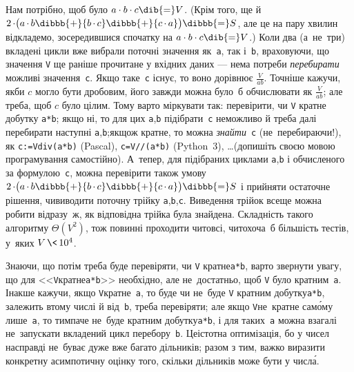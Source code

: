 Нам потрібно, щоб було ${a\cdot b\cdot c}\dib{{=}}V$. (Крім того, ще й ${2\,{\cdot}\bigl(a\,{\cdot}\,b}\dibbb{{+}}{b\,{\cdot}\,c}\dibbb{{+}}{c\,{\cdot}\,a}\bigr)\dibbb{{=}}S$, але це на пару хвилин відкладемо, зосередившися спочатку на ${a\cdot b\cdot c}\dib{{=}}V$.) 
Коли два (а~не~три) вкладені цикли вже вибрали поточні значення як~\texttt{a}, так і~\texttt{b}, враховуючи, що значення \texttt{V} ще раніше прочитане у вхідних даних \nolinebreak[3] --- нема потреби \emph{перебирати} можливі значення~\texttt{c}. Якщо таке~\texttt{c} існує, то воно дорівнює $\frac{V}{ab}$. Точніше кажучи, якби $c$ могло бути дробовим, його завжди можна було~б обчислювати як $\frac{V}{ab}$; але треба, щоб $c$ було цілим. Тому варто міркувати так: перевірити, чи \texttt{V} кратне добутку \texttt{a*b}; якщо ні, то для цих \texttt{a},\nolinebreak[3] \texttt{b} підібрати~\texttt{c} неможливо й треба далі перебирати наступні \texttt{a},\nolinebreak[3] \texttt{b};\linebreak[3] якщо\nolinebreak[3] ж кратне, то можна \emph{знайти}~\texttt{c} (не~перебираючи!), як \texttt{c:=V\nolinebreak[3] div(a*b)} (Pascal), \texttt{c=V//(a*b)} (Python~3), \dots (допишіть своєю мовою програмування самостійно). А~тепер, для підібраних циклами \texttt{a},\nolinebreak[3] \texttt{b} і обчисленого за формулою~\texttt{c}, можна перевірити також умову ${2\,{\cdot}\bigl(a\,{\cdot}\,b}\dibbb{{+}}{b\,{\cdot}\,c}\dibbb{{+}}{c\,{\cdot}\,a}\bigr)\dibbb{{=}}S$ і прийняти остаточне рішення, чи\nolinebreak[3] виводити поточну трійку \texttt{a},\nolinebreak[2] \texttt{b},\nolinebreak[3] \texttt{c}. Виведення трійок все\nolinebreak[3] ще можна робити відразу~ж, як відповідна трійка була знайдена. Складність такого алгоритму $\Theta(V^2)$, тож повинні проходити чи\nolinebreak[3] то\nolinebreak[3] всі, чи\nolinebreak[3] то\nolinebreak[2] хоча~б більшість тестів, у~яких ${V\,{\<}\,10^4}$.

Знаючи, що потім треба буде перевіряти, чи \texttt{V} кратне\nolinebreak[2] \texttt{a*b}, варто звернути увагу, що для <<\texttt{V}\nolinebreak[3] кратне\nolinebreak[2] \mbox{\texttt{a*b}}>> необхідно, але не~достатньо, щоб \texttt{V} було кратним~\texttt{a}. Інакше кажучи, якщо \texttt{V}\nolinebreak[3] кратне~\texttt{a}, то буде чи не~буде \texttt{V} кратним добутку\nolinebreak[2] \texttt{a*b}, залежить в\nolinebreak[2] тому числі й від~\texttt{b}, треба перевіряти; але якщо \texttt{V}\nolinebreak[2] не~кратне сам\'{о}му лише~\texttt{a}, то тим\nolinebreak[2] паче не~буде кратним добутку\nolinebreak[2] \texttt{a*b}, і для таких~\texttt{a} можна взагалі не~запускати вкладений цикл перебору~\texttt{b}. Це\nolinebreak[3] істотна оптимізація, бо у чисел насправді не~буває дуже вже багато дільників; разом з тим, важко виразити конкретну асимпотичну оцінку того, скільки дільників може бути у числ\'{а}. 

